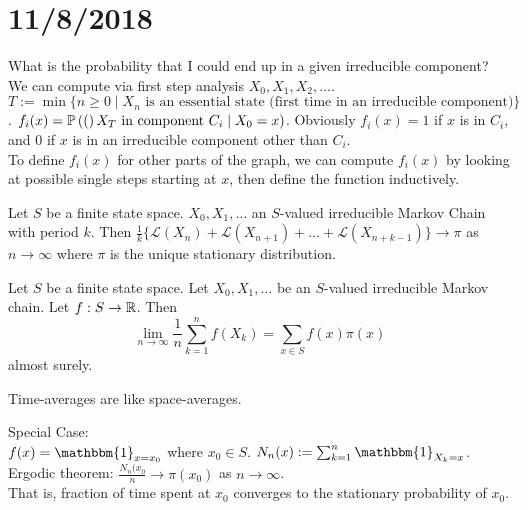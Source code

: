 \documentclass[english, course]{Notes}
\begin{document}
\section{11/8/2018}

What is the probability that I could end up in a given irreducible component?\\

We can compute via first step analysis $X_0, X_1, X_2, \dots$. $T:= \min\{n \geq 0 \mid X_n \text{ is an essential state (first time in an irreducible component)}\}$. $f_i(x) = \mathbb{P}\left((\right)X_T \text{ in component } C_i \mid X_0 = x)$. Obviously $f_i(x) = 1$ if $x$ is in $C_i$, and $0$ if $x$ is in an irreducible component other than $C_i$.\\

To define $f_i(x)$ for other parts of the graph, we can compute $f_i(x)$ by looking at possible single steps starting at $x$, then define the function inductively.

\begin{theorem}
Let $S$ be a finite state space. $X_0, X_1, \dots$ an $S$-valued irreducible Markov Chain with period $k$. Then $\frac{1}{k}\{\mathcal{L}(X_n) + \mathcal{L}(X_{n+1}) + \dots + \mathcal{L}(X_{n + k - 1})\} \to \pi$ as $n \to \infty$ where $\pi$ is the unique stationary distribution.
\end{theorem}

\begin{theorem}
Let $S$ be a finite state space. Let $X_0, X_1, \dots$ be an $S$-valued irreducible Markov chain. Let $f: S \to \mathbb{R}$. Then
\[\lim_{n \to \infty} \frac{1}{n}\sum_{k=1}^n f(X_k) = \sum_{x \in S} f(x) \pi(x)\]
almost surely. 
\end{theorem}

\begin{remark}
	Time-averages are like space-averages.
\end{remark}

Special Case:\\

$f(x) = \mathbbm{1}_{x = x_0}$ where $x_0 \in S$. $N_n(x) := \sum_{k = 1}^n \mathbbm{1}_{X_k = x}$. Ergodic theorem: $\frac{N_n(x_0}{n} \to \pi(x_0)$ as $n \to \infty$.\\

That is, fraction of time spent at $x_0$ converges to the stationary probability of $x_0$.\\
\end{document}
